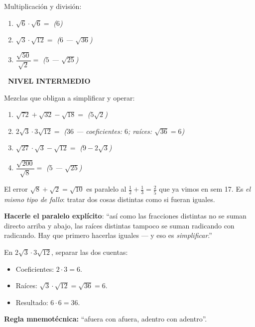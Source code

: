 \documentclass[11pt,a4paper]{article}
\newcommand{\nivelintermedio}{%
  \par\smallskip\colorbox{naranja}{\color{white}\small\bfseries\ NIVEL INTERMEDIO\ }\par\smallskip}
\begin{document}
\medskip
Multiplicación y división:
\begin{enumerate}[label=\textbf{\arabic*.},leftmargin=1cm,itemsep=8pt,start=5]
  \item $\sqrt{6} \cdot \sqrt{6} = $ \hfill \textit{($6$)}
  \item $\sqrt{3} \cdot \sqrt{12} = $ \hfill \textit{($6$ --- $\sqrt{36}$)}
  \item $\dfrac{\sqrt{50}}{\sqrt{2}} = $ \hfill \textit{($5$ --- $\sqrt{25}$)}
\end{enumerate}

\nivelintermedio

Mezclas que obligan a simplificar y operar:
\begin{enumerate}[label=\textbf{\arabic*.},leftmargin=1cm,itemsep=8pt,start=8]
  \item $\sqrt{72} + \sqrt{32} - \sqrt{18} = $ \hfill \textit{($5\sqrt{2}$)}
  \item $2\sqrt{3} \cdot 3\sqrt{12} = $ \hfill \textit{($36$ --- coeficientes: $6$; raíces: $\sqrt{36}=6$)}
  \item $\sqrt{27} \cdot \sqrt{3} - \sqrt{12} = $ \hfill \textit{($9 - 2\sqrt{3}$)}
  \item $\dfrac{\sqrt{200}}{\sqrt{8}} = $ \hfill \textit{($5$ --- $\sqrt{25}$)}
\end{enumerate}

\begin{tcolorbox}[guia-tutor, title={\color{tutormorado} SI SUMA RADICANDOS}]
El error $\sqrt{8} + \sqrt{2} = \sqrt{10}$ es paralelo al $\frac{1}{2} + \frac{1}{3} = \frac{2}{5}$ que ya vimos en sem 17. Es \emph{el mismo tipo de fallo}: tratar dos cosas distintas como si fueran iguales.

\textbf{Hacerle el paralelo explícito}: ``así como las fracciones distintas no se suman directo arriba y abajo, las raíces distintas tampoco se suman radicando con radicando. Hay que primero hacerlas iguales --- y eso es \emph{simplificar}.''
\end{tcolorbox}

\begin{tcolorbox}[guia-tutor, title={\color{tutormorado} MULTIPLICACIÓN CON COEFICIENTE Y RAÍZ}]
En $2\sqrt{3} \cdot 3\sqrt{12}$, separar las dos cuentas:
\begin{itemize}[nosep]
  \item Coeficientes: $2 \cdot 3 = 6$.
  \item Raíces: $\sqrt{3} \cdot \sqrt{12} = \sqrt{36} = 6$.
  \item Resultado: $6 \cdot 6 = 36$.
\end{itemize}

\textbf{Regla mnemotécnica:} ``afuera con afuera, adentro con adentro''.
\end{tcolorbox}
\end{document}
